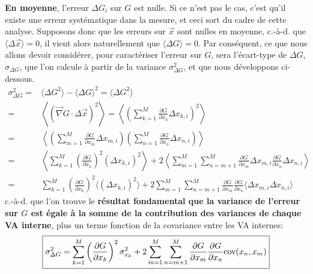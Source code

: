 \documentclass[main.tex]{subfiles}
\begin{document}
\textbf{En moyenne}, l'erreur $\Delta G_i$ sur $G$ est nulle. Si ce n'est pas le cas, c'est qu'il existe une erreur systématique dans la mesure, et ceci sort du cadre de cette analyse. Supposons donc que les erreurs sur $\vec{x}$ sont nulles en moyenne, c.-à-d. que $\langle\Delta\vec{x}\rangle=0$, il vient alors naturellement que $\langle\Delta G\rangle=0$. Par conséquent, ce que nous allons devoir considérer, pour caractériser l'erreur sur $G$, sera l'écart-type de  $\Delta G$, $\sigma_{\Delta G}$, que l'on calcule à partir de la variance $\sigma_{\Delta G}^2$, et que nous développons ci-dessous.
\begin{align*}
    \sigma_{\Delta G}^2= & \langle\Delta G^2\rangle-\langle\Delta G\rangle^2=
    \langle\Delta G^2\rangle                                                                                                                                                                                                                                                                                          \\
    =                    & \left\langle\left(\vec{\nabla} G\cdot\Delta\vec{x}\right)^2\right\rangle=\left\langle\left(\sum\limits_{k=1}^{M}\frac{\partial G}{\partial x_k}\Delta x_{k,i}\right)^2\right\rangle                                                                                                        \\
    =                    & \left\langle\left(\sum\limits_{m=1}^{M}\frac{\partial G}{\partial x_m}\Delta x_{m,i}\right)\left(\sum\limits_{n=1}^{M}\frac{\partial G}{\partial x_n}\Delta x_{n,i}\right)\right\rangle                                                                                                    \\
    =                    & \left\langle\sum\limits_{k=1}^{M}\left(\frac{\partial G}{\partial x_k}\right)^2\left(\Delta x_{k,i}\right)^2\right\rangle+2\left\langle\sum\limits_{m=1}^{M}\sum\limits_{n=m+1}^{M}\frac{\partial G}{\partial x_m}\Delta x_{m,i}\frac{\partial G}{\partial x_n}\Delta x_{n,i}\right\rangle \\
    =                    & \sum\limits_{k=1}^{M}\left(\frac{\partial G}{\partial x_k}\right)^2\langle\left(\Delta x_{k,i}\right)^2\rangle+2\sum\limits_{m=1}^{M}\sum\limits_{n=m+1}^{M}\frac{\partial G}{\partial x_m}\frac{\partial G}{\partial x_n}\langle\Delta x_{m,i}\Delta x_{n,i}\rangle
\end{align*}
c.-à-d. que l'on trouve le \textbf{résultat fondamental que la variance de l'erreur sur $G$ est égale à la somme de la contribution des variances de chaque VA interne}, plus un terme fonction de la covariance entre les VA internes:
\begin{equation}
    \boxed{\sigma^2_{\Delta G}=\sum\limits_{k=1}^{M}\left(\frac{\partial G}{\partial x_k}\right)^2\sigma_{x_k}^2
    +2\sum\limits_{m=1}^{M}\sum\limits_{n=m+1}^{M}\frac{\partial G}{\partial x_m}\frac{\partial G}{\partial x_n}\text{cov}(x_n,x_m)}
    \label{eq:sdg2}
\end{equation}
\end{document}
